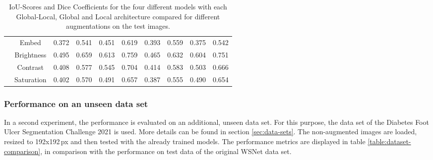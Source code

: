 \begin{table}[htb!]
\begin{tabular}{l | c ||c | c || c | c || c | c || c | c||}
	& Embed & 0.372 & 0.541 & 0.451 & 0.619 & 0.393 & 0.559 & 0.375 & 0.542\\
	& Brightness & 0.495 & 0.659 & 0.613 & 0.759 & 0.465 & 0.632 & 0.604 & 0.751\\
	& Contrast & 0.408 & 0.577& 0.545 & 0.704 & 0.414 & 0.583 & 0.503 & 0.666\\
	& Saturation & 0.402 & 0.570 & 0.491 & 0.657 & 0.387 & 0.555 & 0.490 & 0.654\\
	\end{tabular}
	\caption{IoU-Scores and Dice Coefficients for the four different models with each Global-Local, Global and Local architecture compared for different augmentations on the test images.}
	\label{table:augmentation-comparison}
\end{table}

\subsubsection{Performance on an unseen data set}

In a second experiment, the performance is evaluated on an additional, unseen data set. For this purpose, the data set of the Diabetes Foot Ulcer Segmentation Challenge 2021 \cite{Wang2020} is used. More details can be found in section \ref{sec:data-sets}. The non-augmented images are loaded, resized to 192x192\,px and then tested with the already trained models. The performance metrics are displayed in table \ref{table:dataset-comparison}, in comparison with the performance on test data of the original WSNet data set.


